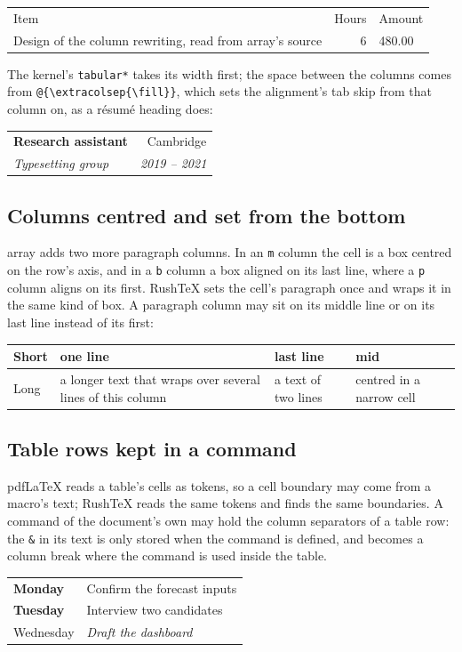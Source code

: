 \documentclass{article}
\numberwithin{equation}{section}
\newcommand{\rtrow}[2]{\textbf{#1} & #2\\}
\def\rtpair#1#2{#1 & {\itshape #2}\\}
\theoremstyle{definition}
\theoremstyle{remark}
\begin{document}
\begin{tabularx}{\linewidth}{@{}X r Y@{}}
Item & Hours & Amount\\
Design of the column rewriting, read from array's source & 6 & 480.00\\
\end{tabularx}

The kernel's \texttt{tabular*} takes its width first; the space between the columns
comes from \verb|@{\extracolsep{\fill}}|, which sets the alignment's tab skip from that
column on, as a résumé heading does:

\noindent\begin{tabular*}{\textwidth}{l@{\extracolsep{\fill}}r}
\textbf{Research assistant} & Cambridge \\
\textit{Typesetting group} & \textit{2019 -- 2021}
\end{tabular*}

\subsection{Columns centred and set from the bottom}\label{sec:mcolumn}
array adds two more paragraph columns. In an \texttt{m} column the cell is a box centred
on the row's axis, and in a \texttt{b} column a box aligned on its last line, where a
\texttt{p} column aligns on its first. RushTeX sets the cell's paragraph once and wraps it
in the same kind of box.
A paragraph column may sit on its middle line or on its last line instead of its first:
\begin{center}
  \begin{tabular}{|l|m{3cm}|b{2.4cm}|>{\centering\arraybackslash}m{1.6cm}|}
    \hline
    Short & one line & last line & mid \\ \hline
    Long & a longer text that wraps over several lines of this column & a text of two lines & centred in a narrow cell \\ \hline
  \end{tabular}
\end{center}

\subsection{Table rows kept in a command}\label{sec:amprow}
pdfLaTeX reads a table's cells as tokens, so a cell boundary may come from a macro's
text; RushTeX reads the same tokens and finds the same boundaries.
A command of the document's own may hold the column separators of a table row: the
\verb|&| in its text is only stored when the command is defined, and becomes a column
break where the command is used inside the table.
\begin{center}
\begin{tabular}{ll}
\toprule
\rtrow{Monday}{Confirm the forecast inputs}
\rtrow{Tuesday}{Interview two candidates}
\midrule
\rtpair{Wednesday}{Draft the dashboard}
\bottomrule
\end{tabular}
\end{center}
\end{document}
